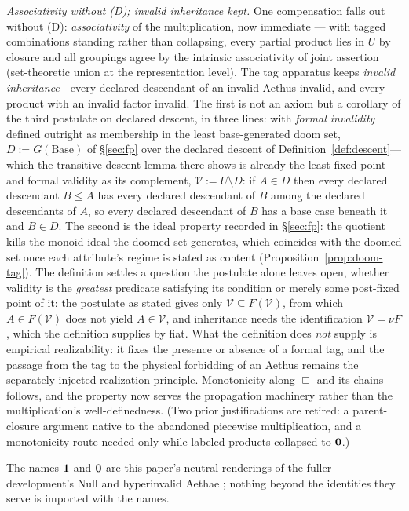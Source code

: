 \textit{Associativity without (D); invalid inheritance kept.} One compensation falls out without (D): \emph{associativity} of the multiplication, now immediate --- with tagged combinations standing rather than collapsing, every partial product lies in $U$ by closure and all groupings agree by the intrinsic associativity of joint assertion (set-theoretic union at the representation level). The tag apparatus keeps \emph{invalid inheritance}---every declared descendant of an invalid Aethus invalid, and every product with an invalid factor invalid. The first is not an axiom but a corollary of the third postulate on declared descent, in three lines: with \emph{formal invalidity} defined outright as membership in the least base-generated doom set, $D := G(\mathrm{Base})$ of §\ref{sec:fp} over the declared descent of Definition~\ref{def:descent}---which the transitive-descent lemma there shows is already the least fixed point---and formal validity as its complement, $\mathcal{V} := U \setminus D$: if $A \in D$ then every declared descendant $B \le A$ has every declared descendant of $B$ among the declared descendants of $A$, so every declared descendant of $B$ has a base case beneath it and $B \in D$. The second is the ideal property recorded in §\ref{sec:fp}: the quotient kills the monoid ideal the doomed set generates, which coincides with the doomed set once each attribute's regime is stated as content (Proposition~\ref{prop:doom-tag}). The definition settles a question the postulate alone leaves open, whether validity is the \emph{greatest} predicate satisfying its condition or merely some post-fixed point of it: the postulate as stated gives only $\mathcal{V} \subseteq F(\mathcal{V})$, from which $A \in F(\mathcal{V})$ does not yield $A \in \mathcal{V}$, and inheritance needs the identification $\mathcal{V} = \nu F$, which the definition supplies by fiat. What the definition does \emph{not} supply is empirical realizability: it fixes the presence or absence of a formal tag, and the passage from the tag to the physical forbidding of an Aethus remains the separately injected realization principle. Monotonicity along $\sqsubseteq$ and its chains follows, and the property now serves the propagation machinery rather than the multiplication's well-definedness. (Two prior justifications are retired: a parent-closure argument native to the abandoned piecewise multiplication, and a monotonicity route needed only while labeled products collapsed to $\mathbf{0}$.)

The names $\mathbf{1}$ and $\mathbf{0}$ are this paper's neutral renderings of the fuller development's Null and hyperinvalid Aethae \cite{Aethus}; nothing beyond the identities they serve is imported with the names.

